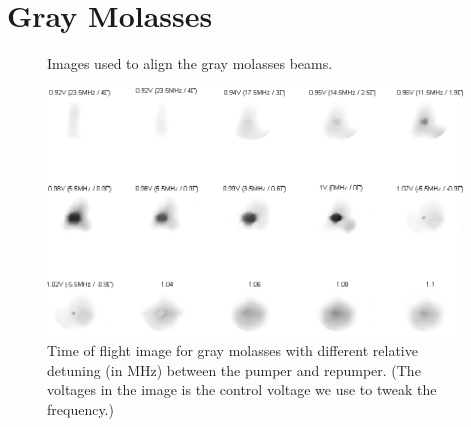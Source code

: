\section{Gray Molasses}\label{exp:gm}
\begin{figure}
  \begin{center}
  \end{center}
  \caption{Images used to align the gray molasses beams.}
  \label{exp:gm-align}
\end{figure}
\begin{figure}
  \begin{center}
    \includegraphics[width=11cm]{gm-ddet.png}
  \end{center}
  \caption{Time of flight image for gray molasses with different relative detuning (in MHz) between the pumper and repumper. (The voltages in the image is the control voltage we use to tweak the frequency.)}
  \label{exp:gm-ddet}
\end{figure}
